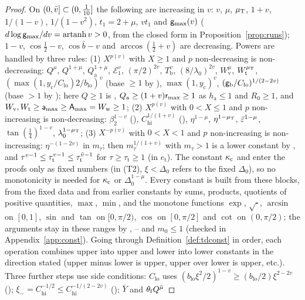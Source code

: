 \begin{proof}
On $(0,\bar v]\subset(0,\frac1{10}]$ the following are increasing in $v$: $v$, $\mu$, $\mu_{\mathrm T}$, $1+v$, $1/(1-v)$, $1/(1-v^2)$,
$t_1=2+\mu$, $vt_1$ and $\mathsf g_{\max}(v)$ ($d\log\mathsf g_{\max}/dv=\operatorname{artanh}v>0$, from the closed form in Proposition~\ref{prop:runs});
$1-v$, $\cos\frac12-v$, $\cos\bar b-v$ and $\arccos(\frac12+v)$ are decreasing. Powers are handled by three rules:
(1) $X^{p(v)}$ with $X\ge1$ and $p$ non-decreasing is non-decreasing: $Q^\mu$, $Q^{1+\mu}$, $Q_{\mathrm a}^{1+\mu}$, $\mathcal E_1^v$,
$(\pi/2)^{2v}$, $T_{\mathrm b}^v$, $(8/\lambda_0)^{2v}$, $W_{\mathrm v}^\mu$, $W_{\mathrm t}^{\mu_{\mathrm T}}$,
$(\max(1,y_{\mathrm c}/C_{\mathrm{lo}})2/b_{\mathrm{lo}})^v$ (base $\ge1$ by ), $\max(1,y_{\mathrm c})^v$,
$(\mathsf g_{\mathrm b}/C_{\mathrm{lo}})^{1/(2-2v)}$ (base $>1$ by ); here $Q\ge1$ is , $Q_{\mathrm a}\ge(1+v)\mathsf r_{\max}\ge1$ as
$h_{\mathrm a}\le1$ and $R_0\ge1$, and $W_{\mathrm v},W_{\mathrm t}\ge\mathsf a_{\max}\ge\mathsf A_{\max}=W_{\mathrm w}\ge1$;
(2) $X^{p(v)}$ with $0<X\le1$ and $p$ non-increasing is non-decreasing: $\beta_2^{1-v}$ (), $C_{\mathrm{hi}}^{1/(1+v)}$
(), $\eta^{1-\mu}$, $\eta^{1-\mu_{\mathrm T}}$, $\bar\varepsilon^{1-\mu}$, $\tan(\frac14)^{1-v}$, $\lambda_0^{1-\mu_{\mathrm T}}$;
(3) $X^{-p(v)}$ with $0<X<1$ and $p$ non-increasing is non-increasing: $\eta^{-(1-2v)}$ in $m_\tau$; then $m_\tau^{1/(1+v)}$ with
$m_\tau>1$ is a lower constant by , and $\tau^{v-1}\le\tau_{\mathrm t}^{v-1}\le\tau_{\mathrm t}^{\bar v-1}$ for
$\tau\ge\tau_{\mathrm t}\ge1$ (in $e_{\mathrm t}$). The constant $\kappa_{\mathrm c}$ and  enter the proofs only as fixed numbers
(in (T2), $\xi<\Delta_0$ refers to the fixed $\Delta_0$), so no monotonicity is needed for $\kappa_{\mathrm c}$ or $\Delta_0^{1-\mu}$. Every constant is built from these blocks, from the fixed data and from earlier
constants by sums, products, quotients of positive quantities, $\max$, $\min$, and the monotone functions $\exp$, $\sqrt\cdot$,
$\arcsin$ on $[0,1]$, $\sin$ and $\tan$ on $[0,\pi/2)$, $\cos$ on $[0,\pi/2]$ and $\cot$ on $(0,\pi/2)$; the arguments stay in these
ranges by , -- and $m_0\le1$ (checked in Appendix~\ref{app:const}). Going through Definition~\ref{def:tdconst} in order, each operation combines upper
into upper and lower into lower constants in the direction stated (upper minus lower is upper, upper over lower is upper, etc.).
Three further steps use side conditions: $C_{\mathrm{lo}}$ uses $(b_{\mathrm{lo}}\xi^2/2)^{1-v}\ge(b_{\mathrm{lo}}/2)\xi^{2-2v}$
(); $\xi_-=C_{\mathrm{hi}}^{-1/2}\le C_{\mathrm{hi}}^{-1/(2-2v)}$ (); $\bar Y$ and $\theta_{\mathrm f}Q^{\bar\mu}$

\end{proof}
